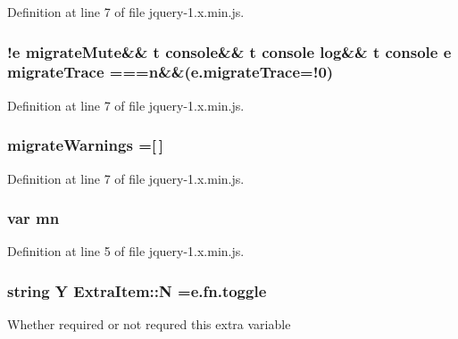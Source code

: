 Definition at line 7 of file jquery-\/1.\+x.\+min.\+js.

\subsubsection[{\texorpdfstring{migrate\+Trace}{migrateTrace}}]{ !{\bf e} migrate\+Mute\&\& {\bf t} console\&\& {\bf t} console {\bf log}\&\& {\bf t} console {\bf e} migrate\+Trace ==={\bf n}\&\&(e.\+migrate\+Trace=!0)}\hypertarget{jquery-1_8x_8min_8js_a6965eb7cecccff575d9c9b1a65e4623f}{}\label{jquery-1_8x_8min_8js_a6965eb7cecccff575d9c9b1a65e4623f}


Definition at line 7 of file jquery-\/1.\+x.\+min.\+js.

\subsubsection[{\texorpdfstring{migrate\+Warnings}{migrateWarnings}}]{ migrate\+Warnings =\mbox{[}$\,$\mbox{]}}\hypertarget{jquery-1_8x_8min_8js_a0242427f8bf1d2c38898b0e4b81ffb2c}{}\label{jquery-1_8x_8min_8js_a0242427f8bf1d2c38898b0e4b81ffb2c}


Definition at line 7 of file jquery-\/1.\+x.\+min.\+js.

\subsubsection[{\texorpdfstring{mn}{mn}}]{\setlength{\rightskip}{0pt plus 5cm}var mn}\hypertarget{jquery-1_8x_8min_8js_a227fb8e4dbaed5a772526c7e9bb0795f}{}\label{jquery-1_8x_8min_8js_a227fb8e4dbaed5a772526c7e9bb0795f}


Definition at line 5 of file jquery-\/1.\+x.\+min.\+js.

\subsubsection[{\texorpdfstring{N}{N}}]{\setlength{\rightskip}{0pt plus 5cm}string Y Extra\+Item\+::N ={\bf e.\+fn.\+toggle}}\hypertarget{jquery-1_8x_8min_8js_ab8a5cba0bbaa18ec7f830663874cb9d0}{}\label{jquery-1_8x_8min_8js_ab8a5cba0bbaa18ec7f830663874cb9d0}
Whether required or not requred this extra variable


